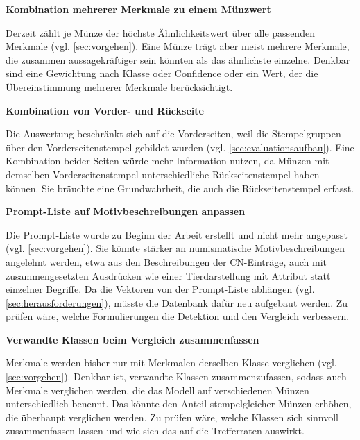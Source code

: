 \vspace{\baselineskip}

\textbf{Kombination mehrerer Merkmale zu einem Münzwert}

\noindent Derzeit zählt je Münze der höchste Ähnlichkeitswert über alle passenden Merkmale (vgl. \cref{sec:vorgehen}). Eine Münze trägt aber meist mehrere Merkmale, die zusammen aussagekräftiger sein könnten als das ähnlichste einzelne. Denkbar sind eine Gewichtung nach Klasse oder Confidence oder ein Wert, der die Übereinstimmung mehrerer Merkmale berücksichtigt. 

\vspace{\baselineskip}

\noindent \textbf{Kombination von Vorder- und Rückseite}

\noindent Die Auswertung beschränkt sich auf die Vorderseiten, weil die Stempelgruppen über den Vorderseitenstempel gebildet wurden (vgl. \cref{sec:evaluationsaufbau}). Eine Kombination beider Seiten würde mehr Information nutzen, da Münzen mit demselben Vorderseitenstempel unterschiedliche Rückseitenstempel haben können. Sie bräuchte eine Grundwahrheit, die auch die Rückseitenstempel erfasst.

\vspace{\baselineskip}

\noindent \textbf{Prompt-Liste auf Motivbeschreibungen anpassen}

\noindent Die Prompt-Liste wurde zu Beginn der Arbeit erstellt und nicht mehr angepasst (vgl. \cref{sec:vorgehen}). Sie könnte stärker an numismatische Motivbeschreibungen angelehnt werden, etwa aus den Beschreibungen der CN-Einträge, auch mit zusammengesetzten Ausdrücken wie einer Tierdarstellung mit Attribut statt einzelner Begriffe. Da die Vektoren von der Prompt-Liste abhängen (vgl. \cref{sec:herausforderungen}), müsste die Datenbank dafür neu aufgebaut werden. Zu prüfen wäre, welche Formulierungen die Detektion und den Vergleich verbessern.

\vspace{\baselineskip}

\noindent \textbf{Verwandte Klassen beim Vergleich zusammenfassen}

\noindent Merkmale werden bisher nur mit Merkmalen derselben Klasse verglichen (vgl. \cref{sec:vorgehen}). Denkbar ist, verwandte Klassen zusammenzufassen, sodass auch Merkmale verglichen werden, die das Modell auf verschiedenen Münzen unterschiedlich benennt. Das könnte den Anteil stempelgleicher Münzen erhöhen, die überhaupt verglichen werden. Zu prüfen wäre, welche Klassen sich sinnvoll zusammenfassen lassen und wie sich das auf die Trefferraten auswirkt.

